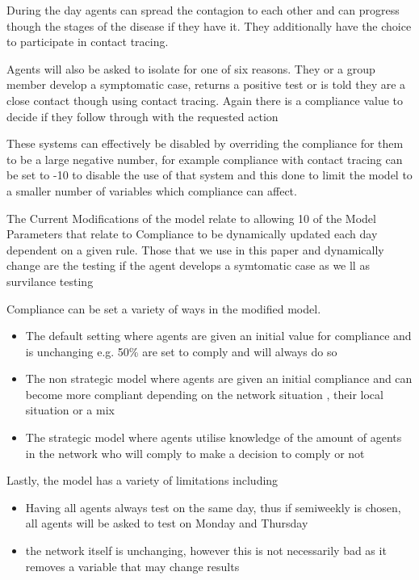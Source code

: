\documentclass{article}
\begin{document}
During the day agents can spread the contagion to each other and can progress though the stages of the disease if they have it. They additionally have the choice to participate in contact tracing.

Agents will also be asked to isolate for one of six reasons. They or a group member develop a symptomatic case, returns a positive test or is told they are a close contact though using contact tracing. Again there is a compliance value to decide if they follow through with the requested action

These systems can effectively be disabled by overriding the compliance for them to be a large negative number, for example compliance with contact tracing can be set to -10 to disable the use of that system and this done to limit the model to a smaller number of variables which compliance can affect.

The Current Modifications of the model relate to allowing 10 of the Model Parameters that relate to Compliance to be dynamically updated each day dependent on a given rule. Those that we use in this paper and dynamically change are the testing if the agent develops a symtomatic case as we ll as survilance testing 

Compliance can be set a variety of ways in the modified model.
\begin{itemize}
\item The default setting where agents are given an initial value for compliance and is unchanging e.g. 50\% are set to comply and will always do so
\item The non strategic model where agents are given an initial compliance and can become more compliant depending on the network situation , their local situation or a mix
\item The strategic model where agents utilise knowledge of the amount of agents in the network who will comply to make a decision to comply or not
\end{itemize}

Lastly, the model has a variety of limitations including 
\begin{itemize}
\item Having all agents always test on the same day, thus if semiweekly is chosen, all agents will be asked to test on Monday and Thursday
\item the network itself is unchanging, however this is not necessarily bad as it removes a variable that may change results
\end{itemize}
\end{document}
